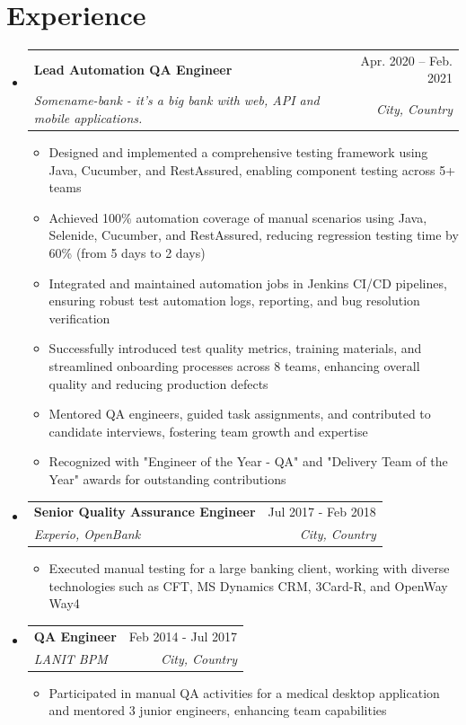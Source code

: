 \documentclass[letterpaper,11pt]{article}
\makeatletter
\newcommand{\resumeItem}[1]{
  \item\small{
    {#1 \vspace{-2pt}}
  }
}
\newcommand{\resumeSubheading}[4]{
  \vspace{-2pt}\item
    \begin{tabular*}{0.97\textwidth}[t]{l@{\extracolsep{\fill}}r}
      \textbf{#1} & #2 \\
      \textit{\small#3} & \textit{\small #4} \\
    \end{tabular*}\vspace{-7pt}
}
\newcommand{\resumeSubHeadingListStart}{\begin{itemize}[leftmargin=0.15in, label={}]}
\newcommand{\resumeSubHeadingListEnd}{\end{itemize}}
\newcommand{\resumeItemListStart}{\begin{itemize}}
\newcommand{\resumeItemListEnd}{\end{itemize}\vspace{-5pt}}
\makeatother
\begin{document}
\section{Experience}
  \resumeSubHeadingListStart

    \resumeSubheading
      {Lead Automation QA Engineer}{Apr. 2020 -- Feb. 2021}
      {Somename-bank - it's a big bank with web, API and mobile applications.}{City, Country}
      \resumeItemListStart
        \resumeItem{Designed and implemented a comprehensive testing framework using Java, Cucumber, and RestAssured, enabling component testing across 5+ teams}
        \resumeItem{Achieved 100\% automation coverage of manual scenarios using Java, Selenide, Cucumber, and RestAssured, reducing regression testing time by 60\% (from 5 days to 2 days)}
        \resumeItem{Integrated and maintained automation jobs in Jenkins CI/CD pipelines, ensuring robust test automation logs, reporting, and bug resolution verification}
        \resumeItem{Successfully introduced test quality metrics, training materials, and streamlined onboarding processes across 8 teams, enhancing overall quality and reducing production defects}
        \resumeItem{Mentored QA engineers, guided task assignments, and contributed to candidate interviews, fostering team growth and expertise}
        \resumeItem{Recognized with "Engineer of the Year - QA" and "Delivery Team of the Year" awards for outstanding contributions}
    \resumeItemListEnd

    \resumeSubheading
      {Senior Quality Assurance Engineer}{Jul 2017 - Feb 2018}
      {Experio, OpenBank}{City, Country}
      \resumeItemListStart
        \resumeItem{Executed manual testing for a large banking client, working with diverse technologies such as CFT, MS Dynamics CRM, 3Card-R, and OpenWay Way4}
      \resumeItemListEnd

    \resumeSubheading
      {QA Engineer}{Feb 2014 - Jul 2017}
      {LANIT BPM}{City, Country}
      \resumeItemListStart
        \resumeItem{Participated in manual QA activities for a medical desktop application and mentored 3 junior engineers, enhancing team capabilities}
      \resumeItemListEnd

  \resumeSubHeadingListEnd
\end{document}

